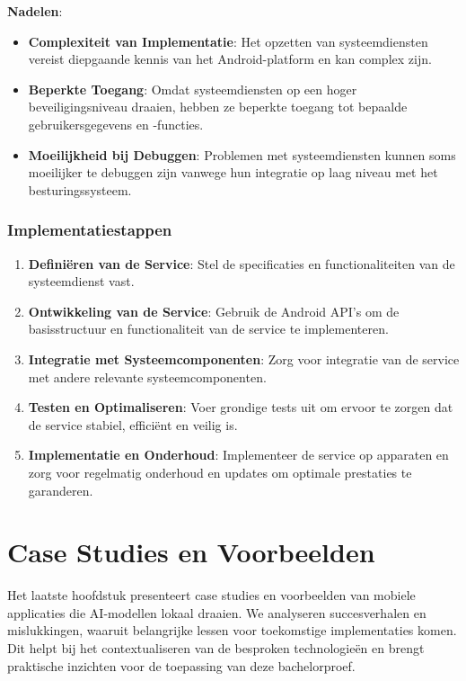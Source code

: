 \textbf{Nadelen}:
\begin{itemize}
    \item \textbf{Complexiteit van Implementatie}: Het opzetten van systeemdiensten vereist diepgaande kennis van het Android-platform en kan complex zijn.
    \item \textbf{Beperkte Toegang}: Omdat systeemdiensten op een hoger beveiligingsniveau draaien, hebben ze beperkte toegang tot bepaalde gebruikersgegevens en -functies.
    \item \textbf{Moeilijkheid bij Debuggen}: Problemen met systeemdiensten kunnen soms moeilijker te debuggen zijn vanwege hun integratie op laag niveau met het besturingssysteem.
\end{itemize}

\subsubsection{Implementatiestappen}

\begin{enumerate}
    \item \textbf{Definiëren van de Service}: Stel de specificaties en functionaliteiten van de systeemdienst vast.
    \item \textbf{Ontwikkeling van de Service}: Gebruik de Android API's om de basisstructuur en functionaliteit van de service te implementeren.
    \item \textbf{Integratie met Systeemcomponenten}: Zorg voor integratie van de service met andere relevante systeemcomponenten.
    \item \textbf{Testen en Optimaliseren}: Voer grondige tests uit om ervoor te zorgen dat de service stabiel, efficiënt en veilig is.
    \item \textbf{Implementatie en Onderhoud}: Implementeer de service op apparaten en zorg voor regelmatig onderhoud en updates om optimale prestaties te garanderen.
\end{enumerate}


\section{Case Studies en Voorbeelden}

Het laatste hoofdstuk presenteert case studies en voorbeelden van mobiele applicaties die AI-modellen lokaal draaien. We analyseren succesverhalen en mislukkingen, waaruit belangrijke lessen voor toekomstige implementaties komen. Dit helpt bij het contextualiseren van de besproken technologieën en brengt praktische inzichten voor de toepassing van deze bachelorproef.


